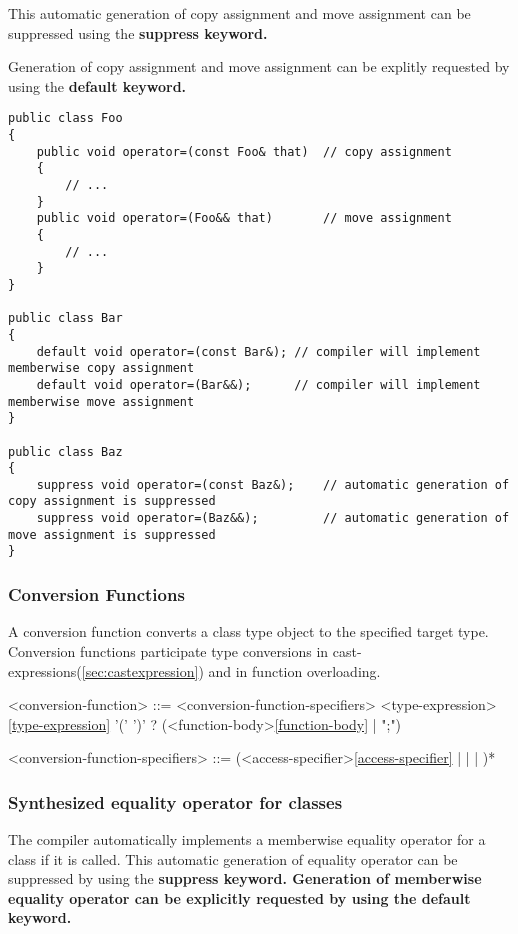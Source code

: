 \documentclass[a4paper,oneside,11pt]{article}
\begin{document}
This automatic generation of copy assignment and move assignment can be suppressed using the
\bf{suppress} keyword.

Generation of copy assignment and move assignment can be explitly requested by using the \bf{default} keyword.

\begin{lstlisting}[frame=trBL]
public class Foo
{
    public void operator=(const Foo& that)  // copy assignment
    {
        // ...
    }
    public void operator=(Foo&& that)       // move assignment
    {
        // ...
    }
}

public class Bar
{
    default void operator=(const Bar&); // compiler will implement memberwise copy assignment
    default void operator=(Bar&&);      // compiler will implement memberwise move assignment
}

public class Baz
{
    suppress void operator=(const Baz&);    // automatic generation of copy assignment is suppressed
    suppress void operator=(Baz&&);         // automatic generation of move assignment is suppressed
}
\end{lstlisting}

\subsubsection{Conversion Functions}\label{sec:conversionfunctions}

A conversion function converts a class type object to the specified target type.
Conversion functions participate type conversions in cast-expressions(\ref{sec:castexpression}) and in function overloading.

\begin{grammar}
\label{conversion-function}<conversion-function> ::= <conversion-function-specifiers> 
<type-expression>\ref{type-expression} '(' ')' ? (<function-body>\ref{function-body} | ";")

<conversion-function-specifiers> ::= (<access-specifier>\ref{access-specifier} |  |  | )*
\end{grammar}

\subsubsection{Synthesized equality operator for classes}\label{sec:synthesizedeq}

The compiler automatically implements a memberwise equality operator for a class if it is called.
This automatic generation of equality operator can be suppressed by using the \bf{suppress} keyword.
Generation of memberwise equality operator can be explicitly requested by using the \bf{default} keyword.
\end{document}
